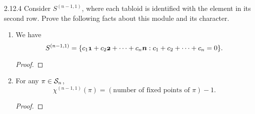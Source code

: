 \documentclass{../../math174}
\date{Wednesday, April 17}
\author{}
\begin{document}
\begin{problemlist}
\item[2.12.4] Consider \(S^{(n-1,1)}\), where each tabloid is
  identified with the element in its second row.  Prove the following
  facts about this module and its character.
  \begin{enumerate}
  \item We have
    \[
      S^{(n-1,1)} = \set{c_1 \vec 1 + c_2 \vec 2 + \dots + c_n \vec n
        : c_1 + c_2 + \dots + c_n = 0}.
    \]

    \begin{solution}
      \begin{proof}

      \end{proof}
    \end{solution}

  \item For any \(\pi \in \mathcal S_n\),
    \[
      \chi^{(n-1,1)}(\pi)
      = (\text{number of fixed points of \(\pi\)}) - 1.
    \]

    \begin{solution}
      \begin{proof}

      \end{proof}
    \end{solution}
  \end{enumerate}
\end{problemlist}
\end{document}
